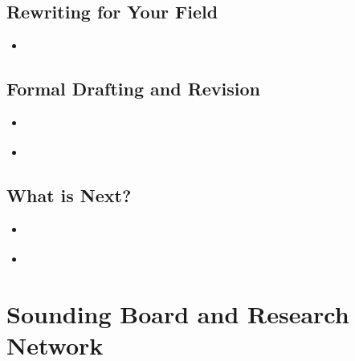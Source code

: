 \documentclass[11pt]{article}
\begin{document}
\subsection{Rewriting for Your Field}
\begin{itemize}
\item \begin{exercise}
\end{exercise} 
\end{itemize}
\subsection{Formal Drafting and Revision}
\begin{itemize}
\item \begin{exercise}
\end{exercise}

\vspace{20pt}
\item \begin{exercise}
\end{exercise}
\end{itemize}
\subsection{What is Next?}
\begin{itemize}
\item \begin{exercise}
\end{exercise}

\vspace{20pt}
\item \begin{exercise}
\end{exercise}
\end{itemize}
\section{Sounding Board and Research Network}
\end{document}

